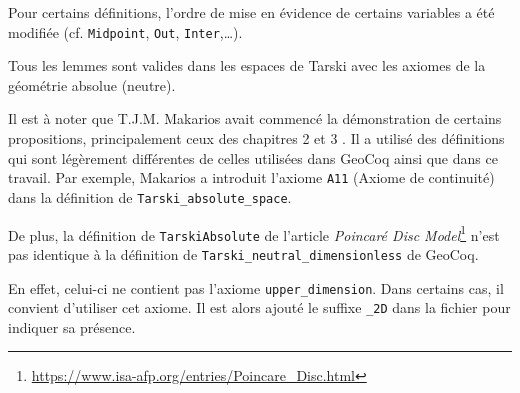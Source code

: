 \documentclass[8pt,a4paper]{article}
\theoremstyle{plain}
\begin{document}
Pour certains définitions, l'ordre de mise en évidence de certains variables a été modifiée (cf. \verb+Midpoint+, \verb+Out+, \verb+Inter+,\dots).


Tous les lemmes sont valides dans les espaces de Tarski avec les axiomes de la géométrie absolue (neutre).


Il est à noter que T.J.M. Makarios \cite{Tarskis_Geometry-AFP} avait commencé
la démonstration de certains propositions, principalement
ceux des chapitres 2 et 3 \cite{tarski}. Il a utilisé des définitions qui sont légèrement différentes
de celles utilisées dans GeoCoq ainsi que dans ce travail.
Par exemple, Makarios a introduit l'axiome \verb+A11+ (Axiome de continuité) dans la définition de
\verb+Tarski_absolute_space+.



De plus, la définition de \verb+TarskiAbsolute+ de l'article \textit{Poincaré Disc Model}\footnote{\url{https://www.isa-afp.org/entries/Poincare_Disc.html}}
\cite{PoincareDisc,Poincare_Disc-AFP} n'est pas identique à la définition de \verb+Tarski_neutral_dimensionless+ de GeoCoq.


En effet, celui-ci ne contient pas l'axiome \verb+upper_dimension+.
Dans certains cas, il convient d'utiliser cet axiome.
Il est alors ajouté le suffixe \verb+_2D+ dans la fichier pour indiquer sa présence.
\end{document}

